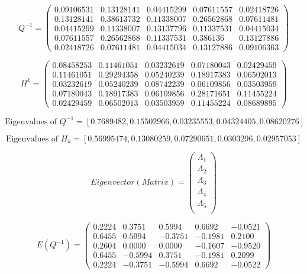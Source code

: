 \documentclass{article}
\begin{document}
$$
Q^{-1}=\left(\begin{array}{ccccc}
0.09106531 & 0.13128141 & 0.04415299 & 0.07611557 & 0.02418726 \\
0.13128141 & 0.38613732 & 0.11338007 & 0.26562868 & 0.07611481 \\
0.04415299 & 0.11338007 & 0.13137796 & 0.11337531 & 0.04415034 \\
0.07611557 & 0.26562868 & 0.11337531 & 0.386136 & 0.13127886 \\
0.02418726 & 0.07611481 & 0.04415034 & 0.13127886 & 0.09106363
\end{array}\right)
$$



$$
H^{k}=\left(\begin{array}{ccccc}
0.08458253 & 0.11461051 & 0.03232619 & 0.07180043 & 0.02429459 \\
0.11461051 & 0.29294358 & 0.05240239 & 0.18917383 & 0.06502013 \\
0.03232619 & 0.05240239 & 0.08742239 & 0.06109856 & 0.03503959 \\
0.07180043 & 0.18917383 & 0.06109856 & 0.28171651 & 0.11455224 \\
0.02429459 & 0.06502013 & 0.03503959 & 0.11455224 & 0.08689895
\end{array}\right)
$$

\[
\text{Eigenvalues of } Q^{-1} = [0.7689482, 0.15502966, 0.03235553, 0.04324405, 0.08620276]
\]


\[
\text{Eigenvalues of } H_k = [0.56995474, 0.13080259, 0.07290651, 0.0303296, 0.02957053]
\]

$$
Eigenvector(Matrix)= \left(\begin{array}{c}
\Lambda_{1}\\
\Lambda_{2}\\
\Lambda_{3}\\
\Lambda_{4}\\
\Lambda_{5}\\
\end{array}\right)
$$


$$
E(Q^{-1})=\left(\begin{array}{ccccc}
  0.2224 & 0.3751 & 0.5994 & 0.6692 & -0.0521 \\
  0.6455 & 0.5994 & -0.3751 & -0.1981 & 0.2100 \\
  0.2604 & 0.0000 & 0.0000 & -0.1607 & -0.9520 \\
  0.6455 & -0.5994 & 0.3751 & -0.1981 & 0.2099 \\
  0.2224 & -0.3751 & -0.5994 & 0.6692 & -0.0522
\end{array}\right)
$$
\end{document}
